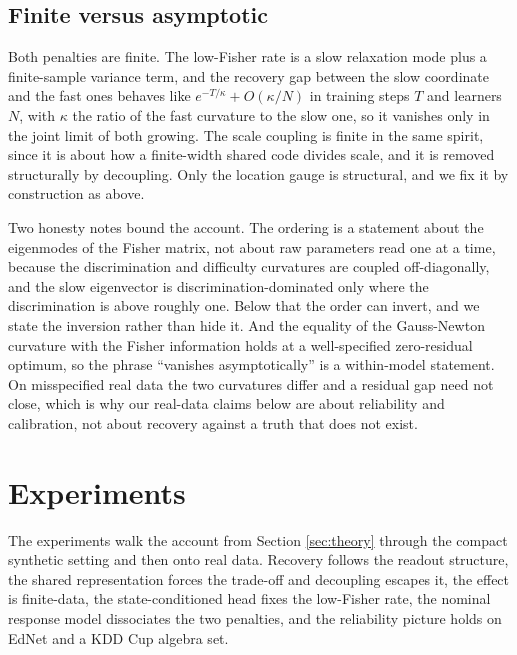\documentclass[sigconf,nonacm,screen]{acmart}
\begin{document}
\subsection{Finite versus asymptotic}
Both penalties are finite. The low-Fisher rate is a slow relaxation mode plus a
finite-sample variance term, and the recovery gap between the slow coordinate and
the fast ones behaves like $e^{-T/\kappa}+O(\kappa/N)$ in training steps $T$ and
learners $N$, with $\kappa$ the ratio of the fast curvature to the slow one, so it
vanishes only in the joint limit of both growing. The scale coupling is finite in
the same spirit, since it is about how a finite-width shared code divides scale, and
it is removed structurally by decoupling. Only the location gauge is structural, and
we fix it by construction as above.

Two honesty notes bound the account. The ordering is a statement about the
eigenmodes of the Fisher matrix, not about raw parameters read one at a time,
because the discrimination and difficulty curvatures are coupled off-diagonally, and
the slow eigenvector is discrimination-dominated only where the discrimination is
above roughly one. Below that the order can invert, and we state the inversion
rather than hide it. And the equality of the Gauss-Newton curvature with the Fisher
information holds at a well-specified zero-residual optimum, so the phrase
``vanishes asymptotically'' is a within-model statement. On misspecified real data
the two curvatures differ and a residual gap need not close, which is why our
real-data claims below are about reliability and calibration, not about recovery
against a truth that does not exist.

\section{Experiments}
\label{sec:exp}
The experiments walk the account from Section \ref{sec:theory} through the compact
synthetic setting and then onto real data. Recovery follows the readout structure,
the shared representation forces the trade-off and decoupling escapes it, the effect
is finite-data, the state-conditioned head fixes the low-Fisher rate, the nominal
response model dissociates the two penalties, and the reliability picture holds on
EdNet and a KDD Cup algebra set.
\end{document}
